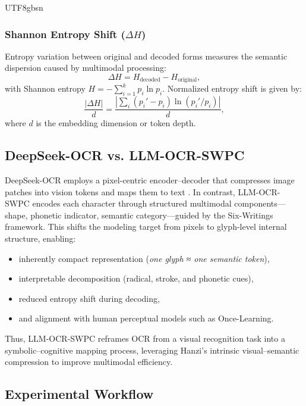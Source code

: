 \documentclass[conference]{IEEEtran}
\begin{document}
\begin{CJK*}{UTF8}{gbsn}
\subsubsection{Shannon Entropy Shift ($\Delta H$)}

Entropy variation between original and decoded forms measures the semantic dispersion caused by multimodal processing:
\begin{equation}
\Delta H = H_{\text{decoded}} - H_{\text{original}},
\end{equation}
with Shannon entropy $H = - \sum_{i=1}^{k} p_i \ln p_i$.    
Normalized entropy shift is given by:
\begin{equation}
\frac{|\Delta H|}{d} = \frac{|\sum_i (p_i' - p_i)\ln(p_i'/p_i)|}{d},
\end{equation}
where $d$ is the embedding dimension or token depth.


\subsection{DeepSeek-OCR vs. LLM-OCR-SWPC}

DeepSeek-OCR employs a pixel-centric encoder–decoder that compresses image patches into vision tokens and maps them to text \cite{wei2025deepseek}. In contrast, LLM-OCR-SWPC encodes each character through structured multimodal components—shape, phonetic indicator, semantic category—guided by the Six-Writings framework. This shifts the modeling target from pixels to glyph-level internal structure, enabling:
\begin{itemize}
\item inherently compact representation (\textit{one glyph ≈ one semantic token}),

\item interpretable decomposition (radical, stroke, and phonetic cues),

\item reduced entropy shift during decoding,

\item and alignment with human perceptual models such as Once-Learning. 
\end{itemize}

Thus, LLM-OCR-SWPC reframes OCR from a visual recognition task into a symbolic–cognitive mapping process, leveraging Hanzi’s intrinsic visual–semantic compression to improve multimodal efficiency.

\subsection{Experimental Workflow}


\end{CJK*}
\end{document}
